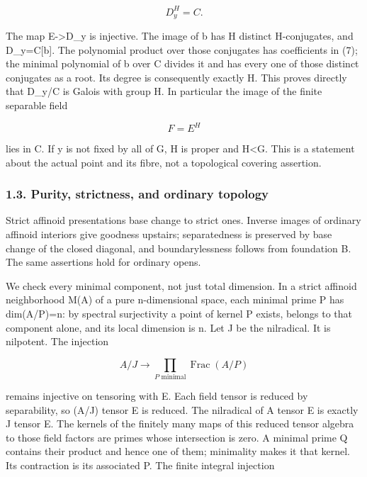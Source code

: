 \documentclass[
  10pt,
]{article}
\begin{document}
\[
 D_y^H=C.                                                   \tag{7}
\]

The map E-\textgreater D\_y is injective. The image of b has
\textbar H\textbar{} distinct H-conjugates, and D\_y=C{[}b{]}. The
polynomial product over those conjugates has coefficients in (7); the
minimal polynomial of b over C divides it and has every one of those
distinct conjugates as a root. Its degree is consequently exactly
\textbar H\textbar. This proves directly that D\_y/C is Galois with
group H. In particular the image of the finite separable field

\[
 F=E^H                                                     \tag{8}
\]

lies in C. If y is not fixed by all of G, H is proper and
\textbar H\textbar\textless\textbar G\textbar. This is a statement about
the actual point and its fibre, not a topological covering assertion.

\subsubsection{1.3. Purity, strictness, and ordinary
topology}\label{purity-strictness-and-ordinary-topology}

Strict affinoid presentations base change to strict ones. Inverse images
of ordinary affinoid interiors give goodness upstairs; separatedness is
preserved by base change of the closed diagonal, and boundarylessness
follows from foundation B. The same assertions hold for ordinary opens.

We check every minimal component, not just total dimension. In a strict
affinoid neighborhood M(A) of a pure n-dimensional space, each minimal
prime P has dim(A/P)=n: by spectral surjectivity a point of kernel P
exists, belongs to that component alone, and its local dimension is n.
Let J be the nilradical. It is nilpotent. The injection

\[
 A/J\longrightarrow\prod_{P\text{ minimal}}\operatorname{Frac}(A/P)
\]

remains injective on tensoring with E. Each field tensor is reduced by
separability, so (A/J) tensor E is reduced. The nilradical of A tensor E
is exactly J tensor E. The kernels of the finitely many maps of this
reduced tensor algebra to those field factors are primes whose
intersection is zero. A minimal prime Q contains their product and hence
one of them; minimality makes it that kernel. Its contraction is its
associated P. The finite integral injection
\end{document}
